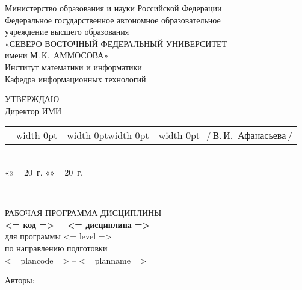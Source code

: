 \documentclass[a4paper,12pt]{article}
\makeatletter
\newcommand{\ulfield}[3]{
  \noindent
  \begin{tabularx}{\linewidth}{@{}l@{}X@{}l@{}}
  #1\if\relax\detokenize{#1}\relax\else\,~\vrule width 0pt\fi 
  & \uline{\vrule width 0pt\hfill#2\hfill\vrule width 0pt} & 
  \if\relax\detokenize{#3}\relax\else\vrule width 0pt~\,\fi #3
  \end{tabularx}
  }
\newcommand{\datefield}[1][]{\if
  \relax\detokenize{#1}\relax
  «\uline{\hspace{22pt}}»~\uline{\hspace{90pt}}\,~20\uline{\hspace{20pt}}~г.\else 
  «\uline{\hspace{18pt}}»~\uline{\hspace{60pt}}\,~20\uline{\hspace{18pt}}~г.\fi
  }
\makeatother
\begin{document}
\sloppy
\thispagestyle{empty}

\noindent
\begin{center}
Министерство образования и науки Российской Федерации \\
Федеральное государственное автономное образовательное \\
учреждение высшего образования\\
«СЕВЕРО-ВОСТОЧНЫЙ ФЕДЕРАЛЬНЫЙ УНИВЕРСИТЕТ \\
имени М.\,К.~АММОСОВА» \\
Институт математики и информатики \\
Кафедра информационных технологий

\vspace{12mm}
\begin{flushright}
\parbox{80mm}{
УТВЕРЖДАЮ\\
Директор ИМИ\\[2mm]
\ulfield{}{}{/\,В.\,И.~Афанасьева\,/}{}\\[1mm]
\datefield
\\[20mm]
}
\end{flushright}


РАБОЧАЯ ПРОГРАММА ДИСЦИПЛИНЫ
\\[2mm]
\textbf{<= код =>\ -- <= дисциплина =>} 
\\[5mm]

для программы <= level =>\\
по направлению подготовки \\
<= plancode => -- <= planname =>
\\[15mm]

\parbox{\textwidth}{
Авторы: %
}
\bigskip


\end{center}
\end{document}

